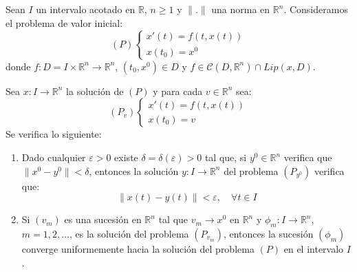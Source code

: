\begin{theorem}
    Sean $I$ un intervalo acotado en $\mathbb{R}$, $n \geq 1$ y $\|.\|$ una norma en $\mathbb{R}^n$.
    Consideramos el problema de valor inicial:
    $$(P) \begin{cases}
            x'(t) = f(t, x(t)) \\
            x(t_0) = x^0
        \end{cases}$$
    donde $f: D = I \times \mathbb{R}^n \to \mathbb{R}^n$, $(t_0, x^0) \in D$ y $f \in \mathcal{C}(D, \mathbb{R}^n) \cap Lip(x, D)$.

    Sea $x: I \to \mathbb{R}^n$ la solución de $(P)$ y para cada $v \in \mathbb{R}^n$ sea:
    $$(P_v) \begin{cases}
            x'(t) = f(t, x(t)) \\
            x(t_0) = v
        \end{cases}$$
    Se verifica lo siguiente:
    \begin{enumerate}
        \item Dado cualquier $\varepsilon > 0$ existe $\delta = \delta(\varepsilon) > 0$ tal que, si $y^0 \in \mathbb{R}^n$ verifica que $\|x^0 - y^0\| < \delta$, entonces la solución $y: I \to \mathbb{R}^n$ del problema $(P_{y^0})$ verifica que:
              $$\|x(t) - y(t)\| < \varepsilon, \quad \forall t \in I$$
        \item Si $(v_m)$ es una sucesión en $\mathbb{R}^n$ tal que $v_m \to x^0$ en $\mathbb{R}^n$ y $\phi_m: I \to \mathbb{R}^n$, $m = 1, 2, \dots$, es la solución del problema $(P_{v_m})$, entonces la sucesión $(\phi_m)$ converge uniformemente hacia la solución del problema $(P)$ en el intervalo $I$.
    \end{enumerate}
\end{theorem}